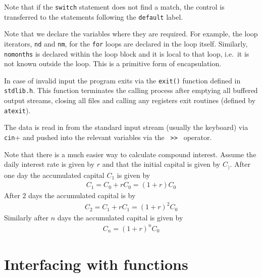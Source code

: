 Note that if the \verb+switch+ 
statement does not find a match, the control is transferred to the statements
following the \verb+default+ label. 

Note  that we declare the variables where they are required.
For example, the loop iterators, \verb+nd+ and \verb+nm+, for the \verb+for+ loops
are declared in the loop itself. Similarly, \verb+nomonths+
is declared within the loop block and it is local to that loop, i.e.\ it is not known
outside the loop. This is a primitive form of encapsulation. 

In case of invalid input the program exits via the \verb+exit()+ function defined
in \verb+stdlib.h+. This function terminates the calling process after emptying
all buffered output streams, closing all files and calling any registers exit
routines (defined by \verb+atexit+). 
 

The data is read in from the standard input stream (usually the keyboard) via
\verb+cin++ and pushed into the relevant variables via the \verb+ >> +
operator.  
 

Note that there is a much easier way to calculate compound interest. Assume the
daily interest rate is given by $r$ and that the initial capital is given by
$C_)$. After one day the accumulated capital $C_1$ is given by
\begin{eqnarray}
  C_1 = C_0 + r C_0 = (1+r)C_0
\nonumber\end{eqnarray}
After $2$ days the accumulated capital is by
\begin{eqnarray}
  C_2 = C_1 + rC_1 = (1+r)^2 C_0
\nonumber \end{eqnarray}
Similarly after $n$ days the accumulated capital is given by
\begin{eqnarray}
  C_n = (1+r)^n C_0
\nonumber \end{eqnarray}


\section{Interfacing with functions}


